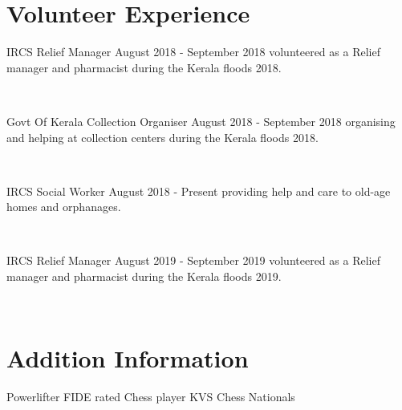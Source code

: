 \documentclass[]{cv-style}          %
\begin{document}
\section{Volunteer Experience}
  \vspace{-0.3cm}
\begin{entrylist}
\entry
{IRCS}
{Relief Manager}
{August 2018 - September 2018}
{volunteered as a Relief manager and pharmacist  during the Kerala floods 2018.}
\end{entrylist}\
\begin{entrylist}
\entry
{Govt Of Kerala}
{Collection Organiser}
{August 2018 - September 2018}
{organising and helping at collection centers during the Kerala floods 2018.}
\end{entrylist}\
\
\begin{entrylist}
\entry
{IRCS}
{Social Worker}
{August 2018 - Present}
{providing help and care to old-age homes and orphanages.}
\end{entrylist}\

\begin{entrylist}
\entry
{IRCS}
{Relief Manager}
{August 2019 - September 2019}
{volunteered as a Relief manager and pharmacist  during the Kerala floods 2019.}
\end{entrylist}\

\clearpage
\section{Addition Information}
  \vspace{-0.3cm}
\begin{entrylist}
\entry
{}
{Powerlifter}
{}
{}
\entry
{}
{FIDE rated Chess player}
{}
{}
\entry
{}
{KVS Chess Nationals }
{}
{}
\end{entrylist}
\end{document}
